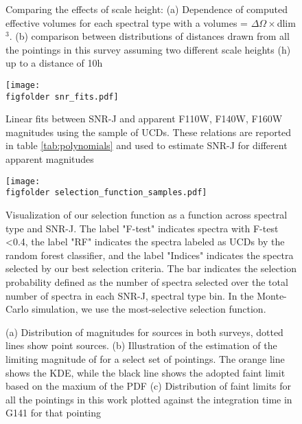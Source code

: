 \documentclass[manuscript]{aastex63}
\begin{document}
\begin{figure}
\centering
{}
\centering
{}
\caption{ Comparing the effects of scale height: (a) Dependence of computed effective volumes for each spectral type with a volumes = $\Delta \Omega \times $dlim$^3$. (b) comparison between distributions of distances drawn from all the pointings in this survey assuming two different scale heights (h) up to a distance of 10h}
\label{fig:simdistr}
\end{figure}

\begin{figure}
    \centering
    \texttt{[image: \\figfolder snr\_fits.pdf]}
    \caption{Linear fits between SNR-J and apparent F110W, F140W, F160W magnitudes using the sample of UCDs. These relations are reported in table \ref{tab:polynomials} and used to estimate SNR-J for different apparent magnitudes}
    \label{fig:snrfits}
\end{figure}

\begin{figure}
    \centering
    \texttt{[image: \\figfolder selection\_function\_samples.pdf]}
    \caption{Visualization of our selection function as a function across spectral type and SNR-J. The label "F-test" indicates spectra with F-test \textless 0.4, the label "RF" indicates the spectra labeled as UCDs by the random forest classifier, and the label "Indices" indicates the spectra selected by our best selection criteria. The bar indicates the selection probability defined as the number of spectra selected over the total number of spectra in each SNR-J, spectral type bin. In the Monte-Carlo simulation, we use the most-selective selection function. }
    \label{fig:selectionf}
\end{figure}




\begin{figure}
    \centering
    \caption{ (a) Distribution of magnitudes for sources in both surveys, dotted lines show point sources. (b) Illustration of the estimation of the limiting magnitude of for a select set of pointings. The orange line shows the KDE, while the black line shows the adopted faint limit based on the maxium of the PDF 
    (c) Distribution of faint limits for all the pointings in this work plotted against the integration time in G141 for that pointing}
    \label{fig:maglimit}
\end{figure}
\end{document}
